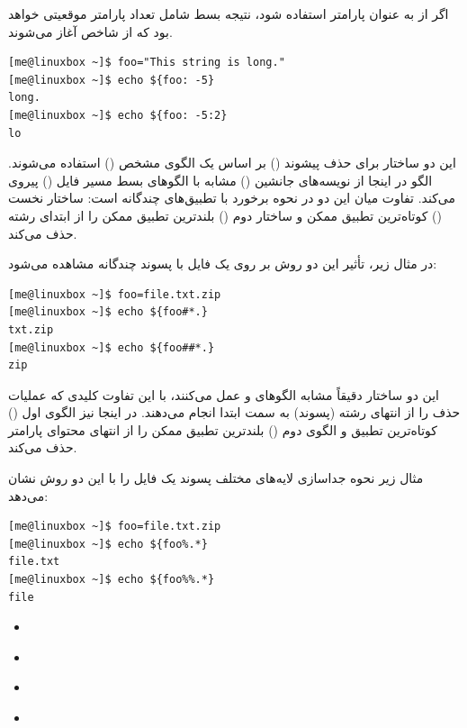 اگر از  به عنوان پارامتر استفاده شود، نتیجه بسط شامل تعداد  پارامتر موقعیتی خواهد بود که از شاخص  آغاز می‌شوند.

\begin{latin}
\begin{lstlisting}
[me@linuxbox ~]$ foo="This string is long."
[me@linuxbox ~]$ echo ${foo: -5}
long.
[me@linuxbox ~]$ echo ${foo: -5:2}
lo
\end{lstlisting}
\end{latin}

\textbf{}
\textbf{}

این دو ساختار برای حذف پیشوند () بر اساس یک الگوی مشخص () استفاده می‌شوند. الگو در اینجا از نویسه‌های جانشین () مشابه با الگوهای بسط مسیر فایل () پیروی می‌کند. تفاوت میان این دو در نحوه برخورد با تطبیق‌های چندگانه است: ساختار نخست (\cmd{\#}) کوتاه‌ترین تطبیق ممکن و ساختار دوم (\cmd{\#\#}) بلندترین تطبیق ممکن را از ابتدای رشته حذف می‌کند.

در مثال زیر، تأثیر این دو روش بر روی یک فایل با پسوند چندگانه مشاهده می‌شود:

\begin{latin}
\begin{lstlisting}
[me@linuxbox ~]$ foo=file.txt.zip
[me@linuxbox ~]$ echo ${foo#*.}
txt.zip
[me@linuxbox ~]$ echo ${foo##*.}
zip
\end{lstlisting}
\end{latin}

\textbf{}
\textbf{}

این دو ساختار دقیقاً مشابه الگوهای \cmd{\#} و \cmd{\#\#} عمل می‌کنند، با این تفاوت کلیدی که عملیات حذف را از انتهای رشته (پسوند) به سمت ابتدا انجام می‌دهند. در اینجا نیز الگوی اول (\cmd{\%}) کوتاه‌ترین تطبیق و الگوی دوم (\cmd{\%\%}) بلندترین تطبیق ممکن را از انتهای محتوای پارامتر حذف می‌کند.

مثال زیر نحوه جداسازی لایه‌های مختلف پسوند یک فایل را با این دو روش نشان می‌دهد:

\begin{latin}
\begin{lstlisting}
[me@linuxbox ~]$ foo=file.txt.zip
[me@linuxbox ~]$ echo ${foo%.*}
file.txt
[me@linuxbox ~]$ echo ${foo%%.*}
file
\end{lstlisting}
\end{latin}

\begin{itemize}
  \item \textbf{}
  \item \textbf{}
  \item \textbf{}
  \item \textbf{}
\end{itemize}

